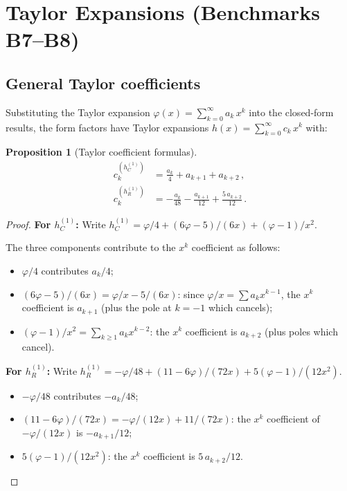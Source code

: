 \documentclass[11pt,a4paper]{article}
\newtheorem{proposition}[theorem]{Proposition}
\theoremstyle{definition}
\theoremstyle{remark}
\begin{document}
\section{Taylor Expansions (Benchmarks B7--B8)}
\label{sec:taylor}

\subsection{General Taylor coefficients}

Substituting the Taylor expansion $\varphi(x) = \sum_{k=0}^\infty a_k\,x^k$
into the closed-form results, the form factors have Taylor expansions
$h(x) = \sum_{k=0}^\infty c_k\,x^k$ with:

\begin{proposition}[Taylor coefficient formulas]
\label{prop:taylor}
\begin{align}
  c_k^{(h_C^{(1)})} &= \frac{a_k}{4} + a_{k+1} + a_{k+2}\,,
  \label{eq:taylor-hC}\\[4pt]
  c_k^{(h_R^{(1)})} &= -\frac{a_k}{48} - \frac{a_{k+1}}{12}
  + \frac{5\,a_{k+2}}{12}\,.
  \label{eq:taylor-hR}
\end{align}
\end{proposition}

\begin{proof}
\textbf{For $h_C^{(1)}$:}
Write $h_C^{(1)} = \varphi/4 + (6\varphi-5)/(6x) + (\varphi-1)/x^2$.

The three components contribute to the $x^k$ coefficient as follows:
\begin{itemize}[nosep]
\item $\varphi/4$ contributes $a_k/4$;
\item $(6\varphi-5)/(6x) = \varphi/x - 5/(6x)$:
  since $\varphi/x = \sum a_k x^{k-1}$, the $x^k$ coefficient is
  $a_{k+1}$ (plus the pole at $k=-1$ which cancels);
\item $(\varphi-1)/x^2 = \sum_{k \geq 1} a_k x^{k-2}$:
  the $x^k$ coefficient is $a_{k+2}$ (plus poles which cancel).
\end{itemize}

\medskip\noindent
\textbf{For $h_R^{(1)}$:}
Write $h_R^{(1)} = -\varphi/48 + (11-6\varphi)/(72x)
+ 5(\varphi-1)/(12x^2)$.
\begin{itemize}[nosep]
\item $-\varphi/48$ contributes $-a_k/48$;
\item $(11-6\varphi)/(72x) = -\varphi/(12x) + 11/(72x)$:
  the $x^k$ coefficient of $-\varphi/(12x)$ is $-a_{k+1}/12$;
\item $5(\varphi-1)/(12x^2)$:
  the $x^k$ coefficient is $5\,a_{k+2}/12$.
\end{itemize}
\end{proof}
\end{document}
